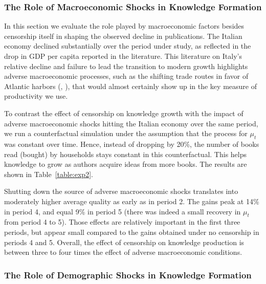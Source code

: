 \subsubsection*{The Role of Macroeconomic Shocks in Knowledge Formation}

In this section we evaluate the role played by macroeconomic factors besides censorship itself in shaping the observed decline in publications. The Italian economy declined substantially over the period under study, as reflected in the drop in GDP per capita reported in the literature. This literature on Italy's relative decline and failure to lead the transition to modern growth highlights adverse macroeconomic processes, such as the shifting  trade routes in favor of Atlantic harbors (, ), that would almost certainly show up in the key measure of productivity we use.

To contrast the effect of censorship on knowledge growth with the  impact of adverse macroeconomic shocks hitting the Italian economy over the same period, we run a counterfactual simulation under the assumption that the process for $\mu_t$ was constant over time. Hence, instead of dropping by 20\%, the number of books read (bought) by households stays constant in this counterfactual. This helps knowledge to grow as authors acquire ideas from more books. The results are shown in Table~\ref{table:exp2}.





Shutting down the source of adverse macroeconomic shocks translates into moderately higher average quality as early as in period 2. The gains peak at 14\% in period 4, and equal 9\% in period 5 (there was indeed a small recovery in $\mu_t$ from period 4 to 5). Those effects are relatively important in the first three periods, but appear small compared to the gains obtained under no censorship in periods 4 and 5.
Overall, the effect of censorship on knowledge production is between three to four times the effect of adverse macroeconomic conditions.

\subsubsection*{The Role of Demographic Shocks in Knowledge Formation}

